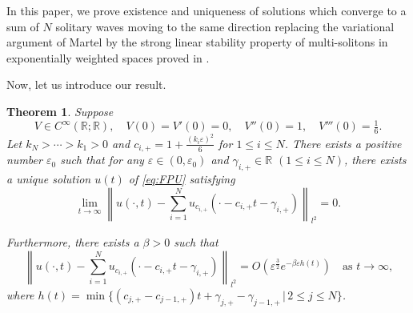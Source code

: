 \documentclass[11pt]{amsart}
\newtheorem{theorem}{Theorem}[section]
\theoremstyle{remark}
\numberwithin{equation}{section}
\begin{document}
In this paper, we prove existence and uniqueness of solutions which converge
to a sum of $N$ solitary waves moving to the same direction
replacing the variational argument of Martel \cite{Ma} by the strong linear
stability property of multi-solitons in exponentially 
weighted spaces proved in \cite{Mi2}.
\par
Now, let us introduce our result.
\begin{theorem}
  \label{thm:1}
Suppose 
\begin{equation}
  \label{eq:H1}
V\in C^\infty({\mathbb{R}};{\mathbb{R}}),\quad V(0)=V'(0)=0, \quad V''(0)=1, \quad
 V'''(0)=\tfrac16.
\tag{H1}
\end{equation}
Let $k_{N}>\cdots>k_1>0$ and $c_{i,+}=1+\frac{(k_i{\varepsilon})^2}{6}$ for $1\le i\le N$.
There exists a positive number ${\varepsilon}_0$ such that for any 
${\varepsilon}\in(0,{\varepsilon}_0)$ and $\gamma_{i,+}\in{\mathbb{R}}$ $(1\le i\le N)$,
there exists a unique solution $u(t)$ of \eqref{eq:FPU} satisfying
\begin{equation}
  \label{eq:convergence}
\lim_{t\to\infty}\left\|u(\cdot,t)
-\sum_{i=1}^Nu_{c_{i,+}}(\cdot-c_{i,+}t-\gamma_{i,+})\right\|_{l^2}=0.
\end{equation}
\par
Furthermore, there exists a $\beta>0$ such that
\begin{equation}
  \label{eq:expconvergence}
\left\|u(\cdot,t)-\sum_{i=1}^Nu_{c_{i,+}}(\cdot-c_{i,+}t-\gamma_{i,+})
\right\|_{l^2} =O({\varepsilon}^{\frac32}e^{-\beta{\varepsilon} h(t)})
\quad\text{as $t\to \infty$,}  
\end{equation}
where $h(t)=\min\{(c_{j,+}-c_{j-1,+})t+\gamma_{j,+}-\gamma_{j-1,+}
\,|\,2\le j\le N\}$.
\end{theorem}
\end{document}

